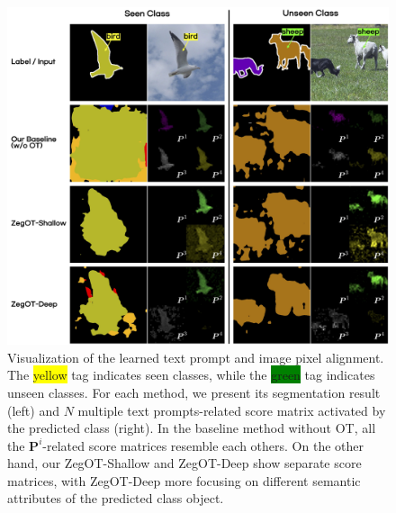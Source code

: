\documentclass[nohyperref]{article}
\newcommand{\bs}{\boldsymbol}
\theoremstyle{plain}
\theoremstyle{definition}
\theoremstyle{remark}
\begin{document}
\begin{figure}[!h]
\vskip 0.1in
\begin{center}
\includegraphics[width=1\linewidth]{fig/scoremap_apen.jpg}
\caption{Visualization of the learned text prompt and image pixel alignment. The \colorbox{yellow}{yellow} tag indicates seen classes, while the \colorbox{green}{green} tag indicates unseen classes. For each method, we present its segmentation result (left) and $N$ multiple text prompts-related score matrix activated by the predicted class (right). 
In the baseline method without OT, all the $\bs{P}^i$-related score matrices resemble each others. On the other hand, our ZegOT-Shallow and ZegOT-Deep show separate score matrices, with ZegOT-Deep more focusing on different semantic attributes of the predicted class object.
}
\label{fig_score_appen}
\end{center}
\vskip -0.1in
\end{figure}
\end{document}
